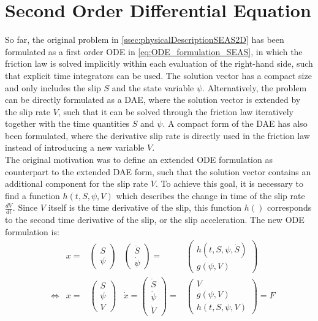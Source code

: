 \section{Second Order Differential Equation}
So far, the original problem in \autoref{ssec:physicalDescriptionSEAS2D} has been formulated as a first order ODE in \autoref{eq:ODE_formulation_SEAS}, in which the friction law is solved implicitly within each evaluation of the right-hand side, such that explicit time integrators can be used. The solution vector has a compact size and only includes the slip $S$ and the state variable $\psi$. Alternatively, the problem can be directly formulated as a DAE, where the solution vector is extended by the slip rate $V$, such that it can be solved through the friction law iteratively together with the time quantities $S$ and $\psi$. A compact form of the DAE has also been formulated, where the derivative slip rate is directly used in the friction law instead of introducing a new variable $V$. \\
The original motivation was to define an extended ODE formulation as counterpart to the extended DAE form, such that the solution vector contains an additional component for the slip rate $V$. To achieve this goal, it is necessary to find a function $h(t,S,\psi,V)$ which describes the change in time of the slip rate $\frac{dV}{dt}$. Since $V$ itself is the time derivative of the slip, this function $h()$ corresponds to the second time derivative of the slip, or the slip acceleration. The new ODE formulation is: 
\begin{align}
&&	 x      =& \begin{pmatrix}	S                     \\ \psi           \end{pmatrix}      &
	 		   \begin{pmatrix}	\ddot{S}              \\ \dot{\psi}     \end{pmatrix}
			=& \begin{pmatrix}	h(t,S,\psi,\dot{S})   \\ g(\psi, V)     \end{pmatrix}
			 	 		 \\ &\Leftrightarrow&	 		  		 
	 x      =& \begin{pmatrix}	S       \\ \psi       \\ V	            \end{pmatrix}      &
   	\dot{x}  = \begin{pmatrix}	\dot{S} \\ \dot{\psi} \\ \dot{V}        \end{pmatrix}
	 		=& \begin{pmatrix}	 V      \\ g(\psi, V) \\ h(t,S,\psi,V)  \end{pmatrix}
	 		 = F	
\end{align}
